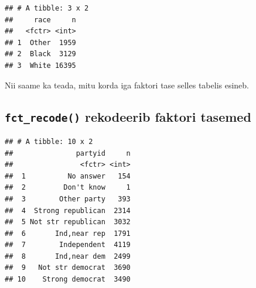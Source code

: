 \documentclass[]{book}
\newenvironment{Shaded}{\begin{snugshade}}{\end{snugshade}}
\newcommand{\KeywordTok}[1]{\textcolor[rgb]{0.13,0.29,0.53}{\textbf{#1}}}
\newcommand{\StringTok}[1]{\textcolor[rgb]{0.31,0.60,0.02}{#1}}
\newcommand{\OperatorTok}[1]{\textcolor[rgb]{0.81,0.36,0.00}{\textbf{#1}}}
\newcommand{\NormalTok}[1]{#1}
\begin{document}
\begin{Shaded}
\end{Shaded}

\begin{verbatim}
## # A tibble: 3 x 2
##     race     n
##   <fctr> <int>
## 1  Other  1959
## 2  Black  3129
## 3  White 16395
\end{verbatim}

Nii saame ka teada, mitu korda iga faktori tase selles tabelis esineb.

\subsection{\texorpdfstring{\texttt{fct\_recode()} rekodeerib faktori
tasemed}{fct\_recode() rekodeerib faktori tasemed}}\label{fct_recode-rekodeerib-faktori-tasemed}

\begin{Shaded}
\end{Shaded}

\begin{verbatim}
## # A tibble: 10 x 2
##               partyid     n
##                <fctr> <int>
##  1          No answer   154
##  2         Don't know     1
##  3        Other party   393
##  4  Strong republican  2314
##  5 Not str republican  3032
##  6       Ind,near rep  1791
##  7        Independent  4119
##  8       Ind,near dem  2499
##  9   Not str democrat  3690
## 10    Strong democrat  3490
\end{verbatim}
\end{document}
